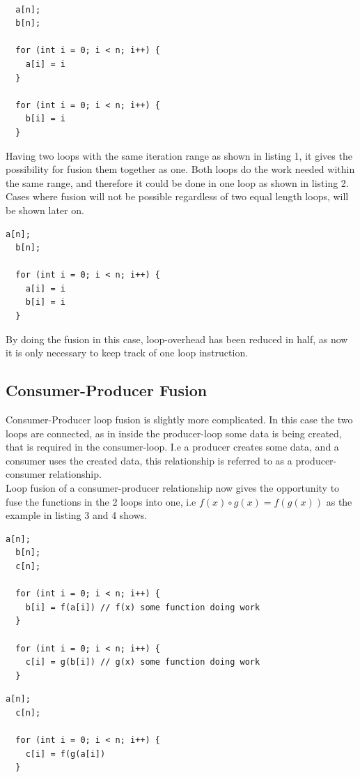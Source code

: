 \documentclass[11pt]{article}
\begin{document}
\begin{lstlisting}[caption=Pre-fusion.]

  a[n];
  b[n];

  for (int i = 0; i < n; i++) {
    a[i] = i
  }

  for (int i = 0; i < n; i++) {
    b[i] = i
  }
\end{lstlisting}
Having two loops with the same iteration range as shown in listing 1, it gives the possibility for fusion them together as one. Both loops do the work needed within the same range, and therefore it could be done in one loop as shown in listing 2. Cases where fusion will not be possible regardless of two equal length loops, will be shown later on.

\begin{lstlisting}[caption=Post-fusion.]
  a[n];
  b[n];
  
  for (int i = 0; i < n; i++) {
    a[i] = i
    b[i] = i  
  }
\end{lstlisting}

By doing the fusion in this case, loop-overhead has been reduced in half, as now it is only necessary to keep track of one loop instruction.

\subsection{Consumer-Producer Fusion}
Consumer-Producer loop fusion is slightly more complicated. In this case the two loops are connected, as in inside the producer-loop some data is being created, that is required in the consumer-loop. I.e a producer creates some data, and a consumer uses the created data, this relationship is referred to as a producer-consumer relationship. \\
Loop fusion of a consumer-producer relationship now gives the opportunity to fuse the functions in the 2 loops into one, i.e $f(x) \circ g(x) = f(g(x))$ as the example in listing 3 and 4 shows. 

\begin{lstlisting}[caption=Producer-Consumer pre-fusion.] 
  a[n];
  b[n];
  c[n];
  	  
  for (int i = 0; i < n; i++) {
    b[i] = f(a[i]) // f(x) some function doing work  
  }
  
  for (int i = 0; i < n; i++) {
    c[i] = g(b[i]) // g(x) some function doing work
  }
\end{lstlisting}

\begin{lstlisting}[caption=Producer-Consumer post-fusion.] 
  a[n];
  c[n];
  	  
  for (int i = 0; i < n; i++) {
    c[i] = f(g(a[i])
  }
\end{lstlisting}
\end{document}
